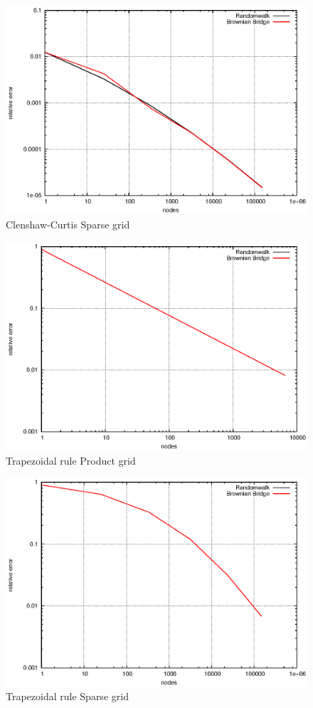 \documentclass[]{article}
\begin{document}
\begin{figure}[!ht]
\centering
\includegraphics{task16_ccsparse}
\caption{Clenshaw-Curtis Sparse grid}
\label{fig:Task16b}
\end{figure}

\begin{figure}[!ht]
\centering
\includegraphics{task16_trapprod}
\caption{Trapezoidal rule Product grid}
\label{fig:Task16c}
\end{figure}

\begin{figure}[!ht]
\centering
\includegraphics{task16_trapsparse}
\caption{Trapezoidal rule Sparse grid }
\label{fig:Task16d}
\end{figure}
\end{document}
